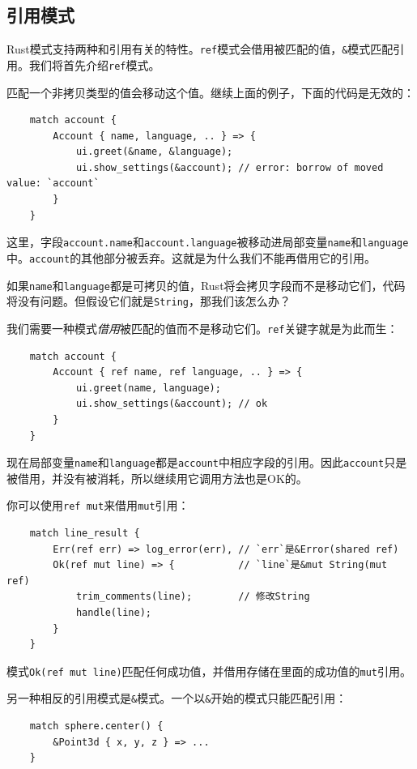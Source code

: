 \subsection{引用模式}
Rust模式支持两种和引用有关的特性。\texttt{ref}模式会借用被匹配的值，\texttt{\&}模式匹配引用。我们将首先介绍\texttt{ref}模式。

匹配一个非拷贝类型的值会移动这个值。继续上面的例子，下面的代码是无效的：
\begin{verbatim}
    match account {
        Account { name, language, .. } => {
            ui.greet(&name, &language);
            ui.show_settings(&account); // error: borrow of moved value: `account`
        }
    }
\end{verbatim}

这里，字段\texttt{account.name}和\texttt{account.language}被移动进局部变量\texttt{name}和\texttt{language}中。\texttt{account}的其他部分被丢弃。这就是为什么我们不能再借用它的引用。

如果\texttt{name}和\texttt{language}都是可拷贝的值，Rust将会拷贝字段而不是移动它们，代码将没有问题。但假设它们就是\texttt{String}，那我们该怎么办？

我们需要一种模式\emph{借用}被匹配的值而不是移动它们。\texttt{ref}关键字就是为此而生：
\begin{verbatim}
    match account {
        Account { ref name, ref language, .. } => {
            ui.greet(name, language);
            ui.show_settings(&account); // ok
        }
    }
\end{verbatim}

现在局部变量\texttt{name}和\texttt{language}都是\texttt{account}中相应字段的引用。因此\texttt{account}只是被借用，并没有被消耗，所以继续用它调用方法也是OK的。

你可以使用\texttt{ref mut}来借用\texttt{mut}引用：
\begin{verbatim}
    match line_result {
        Err(ref err) => log_error(err), // `err`是&Error(shared ref)
        Ok(ref mut line) => {           // `line`是&mut String(mut ref)
            trim_comments(line);        // 修改String
            handle(line);
        }
    }
\end{verbatim}

模式\texttt{Ok(ref mut line)}匹配任何成功值，并借用存储在里面的成功值的\texttt{mut}引用。

另一种相反的引用模式是\texttt{\&}模式。一个以\texttt{\&}开始的模式只能匹配引用：
\begin{verbatim}
    match sphere.center() {
        &Point3d { x, y, z } => ...
    }
\end{verbatim}

